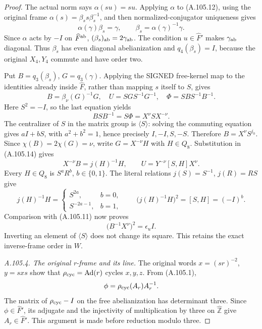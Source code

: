 \begin{proof}
The actual norm says \(\alpha(su)=su\). Applying \(\alpha\)
to (A.105.12), using the original frame \(\alpha(s)=\beta_s
s\beta_s^{-1}\), and then normalized-conjugator uniqueness gives
\[
 \alpha(\gamma)\beta_s=\gamma,\qquad
 \beta_s=\alpha(\gamma)^{-1}\gamma.
\tag{A.105.13}
\]
Since \(\alpha\) acts by \(-I\) on \(\widehat F^{\rm ab}\),
\((\beta_s)_{\rm ab}=2\gamma_{\rm ab}\). The condition
\(u\in\widehat F'\) makes \(\gamma_{\rm ab}\) diagonal.
Thus \(\beta_s\) has even diagonal abelianization and
\(q_4(\beta_s)=I\), because the original \(X_4,Y_4\) commute
and have order two.

Put \(B=q_3(\beta_s)\), \(G=q_3(\gamma)\). Applying the
SIGNED free-kernel map to the identities already inside
\(\widehat F\), rather than mapping \(s\) itself to \(S\), gives
\[
 B=\beta_\nu(G)^{-1}G,\quad
 U=SGS^{-1}G^{-1},\quad
 \Phi=SBS^{-1}B^{-1}.
\tag{A.105.14}
\]
Here \(S^2=-I\), so the last equation yields
\[
 BSB^{-1}=S\Phi=X^\nu SX^{-\nu}.
\]
The centralizer of \(S\) in the matrix group is \(\langle S\rangle\):
solving the commuting equation gives \(aI+bS\), with
\(a^2+b^2=1\), hence precisely \(I,-I,S,-S\).
Therefore \(B=X^\nu S^{j_0}\). Since
\(\chi(B)=2\chi(G)=\nu\), write \(G=X^{-\nu}H\) with \(H\in Q_8\).
Substitution in (A.105.14) gives
\[
 X^{-\nu}B=j(H)^{-1}H,\qquad
 U=Y^{-\nu}[S,H]X^\nu.
\tag{A.105.15}
\]
Every \(H\in Q_8\) is \(S^aR^b\), \(b\in\{0,1\}\).
The literal relations \(j(S)=S^{-1}\), \(j(R)=RS\) give
\[
 j(H)^{-1}H=
 \begin{cases}S^{2a},&b=0,\\S^{-2a-1},&b=1,\end{cases}
 \qquad
 \bigl(j(H)^{-1}H\bigr)^2=[S,H]=(-I)^b.
\tag{A.105.16}
\]
Comparison with (A.105.11) now proves
\[
 \bigl(B^{-1}X^\nu\bigr)^2=\epsilon_u I.
\tag{A.105.17}
\]
Inverting an element of \(\langle S\rangle\) does not change
its square. This retains the exact inverse-frame order in \(W\).

\emph{A.105.4. The original r-frame and its line.}
The original words \(x=(sr)^{-2}\), \(y=sxs\) show that
\(\rho_{\rm cyc}=\operatorname{Ad}(r)\) cycles \(x,y,z\).
From (A.105.1),
\[
 \phi=\rho_{\rm cyc}(A_r)A_r^{-1}.
\]
The matrix of \(\rho_{\rm cyc}-I\) on the free abelianization
has determinant three. Since \(\phi\in\widehat F'\), its
adjugate and the injectivity of multiplication by three on
\(\widehat{\mathbb Z}\) give \(A_r\in\widehat F'\).
This argument is made before reduction modulo three.


\end{proof}
